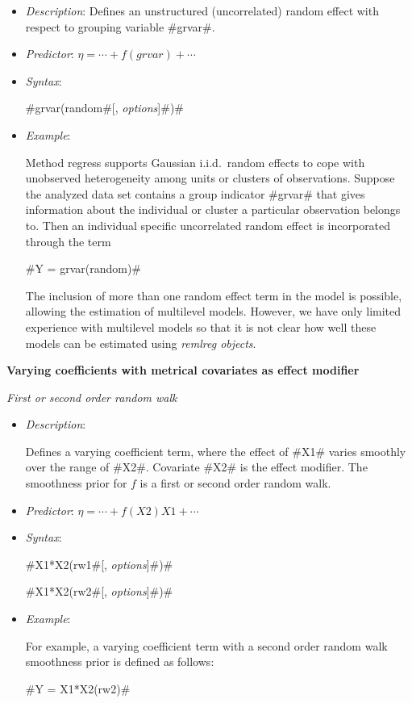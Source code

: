 \begin{itemize}
\item[] {\em Description}: Defines an unstructured (uncorrelated) random effect with respect
to grouping variable #grvar#.
\item[] {\em Predictor}: $\eta = \cdots + f(grvar) + \cdots$
\item[] {\em Syntax}:

#grvar(random#[, {\em options}]#)#
\item[] {\em Example}:

Method regress supports Gaussian i.i.d.~random effects to cope
with unobserved heterogeneity among units or clusters of
observations. Suppose the analyzed data set contains a group
indicator #grvar# that gives information about the individual or
cluster a particular observation belongs to. Then an individual
specific uncorrelated random effect is incorporated through the
term

#Y = grvar(random)#

The inclusion of more than one random effect term in the model is
possible, allowing the estimation of multilevel models. However,
we have only limited experience with multilevel models so that it
is not clear how well these models can be estimated using {\em
remlreg objects}.
\end{itemize}

\newpage

{\bf Varying coefficients with metrical covariates as effect
modifier} \medskip

{\em First or second order random walk}

\begin{itemize}
\item[] {\em Description}:

Defines a varying coefficient term, where the effect of #X1# varies
smoothly over the range of #X2#. Covariate #X2# is the effect
modifier. The smoothness prior for $f$ is a first or second order
random walk.
\item[] {\em Predictor}: $\eta= \cdots + f(X2)X1 + \cdots$
\item[] {\em Syntax}:

#X1*X2(rw1#[, {\em options}]#)#

#X1*X2(rw2#[, {\em options}]#)#
\item[] {\em Example}:

For example, a varying coefficient term with a second order random
walk smoothness prior is defined as follows:

#Y = X1*X2(rw2)#
\end{itemize}


